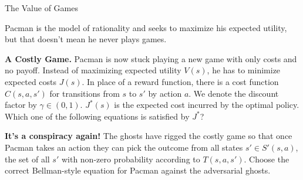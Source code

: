 \begin{problem}[]{The Value of Games}

Pacman is the model of rationality and seeks to maximize his expected utility,\\
but that doesn't mean he never plays games.


\begin{question}[4] \textbf{A Costly Game.}
  Pacman is now stuck playing a new game with only costs and no payoff. Instead
  of maximizing expected utility $V(s)$, he has to minimize expected costs
  $J(s)$.  In place of a reward function, there is a cost function $C(s,a,s')$
  for transitions from $s$ to $s'$ by action $a$. We denote the discount
  factor by $\gamma \in (0,1)$. $J^*(s)$ is the expected cost incurred by the
  optimal policy. Which one of the following equations is satisfied by $J^*$?

  \ThreeA
\end{question}


\begin{question}[4] \textbf{It's a conspiracy again!}
  The ghosts have rigged the costly game so that once Pacman takes an action
  they can pick the outcome from all states $s' \in S'(s,a)$, the set of all
  $s'$ with non-zero probability according to $T(s,a,s')$. Choose the correct
  Bellman-style equation for Pacman against the adversarial ghosts.

  \ThreeB
\end{question}
\end{problem}